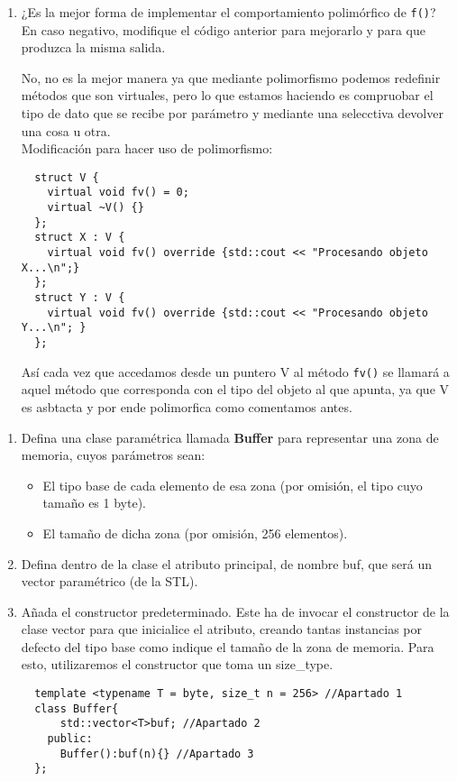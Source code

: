 \begin{enumerate}[label = \alph*)]
    \item ¿Es la mejor forma de implementar el comportamiento
  polimórfico de \texttt{f()}? En caso negativo, modifique el código
  anterior para mejorarlo y para que produzca la misma salida.

  No, no es la mejor manera ya que mediante polimorfismo podemos redefinir métodos que son virtuales, pero lo que estamos haciendo es compruobar el tipo de dato que se recibe por parámetro y mediante una selecctiva devolver una cosa u otra.\\
  Modificación para hacer uso de polimorfismo:

  \begin{verbatim}
  struct V {
    virtual void fv() = 0;
    virtual ~V() {}
  };
  struct X : V {
    virtual void fv() override {std::cout << "Procesando objeto X...\n";}
  };
  struct Y : V {
    virtual void fv() override {std::cout << "Procesando objeto Y...\n"; }
  };
  \end{verbatim}
  Así cada vez que accedamos desde un puntero V al método \texttt{fv()} se llamará a aquel método que corresponda con el tipo del objeto al que apunta, ya que V es asbtacta y por ende polimorfica como comentamos antes.
\end{enumerate}
  
\begin{enumerate}[label = \alph*)]
\item Defina una clase paramétrica llamada \textbf{Buffer} para representar una zona de memoria, cuyos parámetros sean:
\begin{itemize}
  \item El tipo base de cada elemento de esa zona (por omisión, el tipo cuyo tamaño es 1 byte).

  \item El tamaño de dicha zona (por omisión, 256 elementos).
\end{itemize}

\item Defina dentro de la clase el atributo principal, de nombre buf, que será un vector paramétrico (de la STL).


\item Añada el constructor predeterminado. Este ha de invocar el constructor de la clase vector para que inicialice el atributo, creando tantas instancias por defecto del tipo base como indique el tamaño de la zona de memoria. Para esto, utilizaremos el constructor que toma un size\_type.

\begin{verbatim}
  template <typename T = byte, size_t n = 256> //Apartado 1
  class Buffer{
      std::vector<T>buf; //Apartado 2
    public:
      Buffer():buf(n){} //Apartado 3
  };
\end{verbatim}
\end{enumerate}
\newpage

